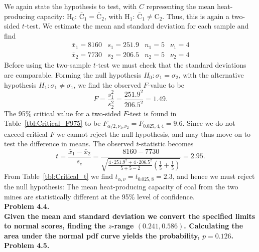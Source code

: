 We again state the hypothesis to test, with $C$ representing the mean heat-producing capacity: H$_0$: $\bar{\mbox{C}}_1 = \bar{\mbox{C}}_2$,
with H$_1$: $\bar{\mbox{C}}_1 \neq {\mbox{C}}_2$.  Thus, this is again a two-sided $t$-test.  We estimate the mean and
standard deviation for each sample and find
\[ \begin{array}{cccc}
\bar{x}_1 = 8160 & s_1 = 251.9 & n_1 = 5 & \nu_1 = 4 \\
\bar{x}_2 = 7730 & s_2 = 206.5 & n_2 = 5 & \nu_2 = 4
\end{array}
\]
Before using the two-sample $t$-test we must check that the standard deviations are
comparable.  Forming the null hypothesis $H_0: \sigma_1 = \sigma_2$, with the alternative
hypothesis $H_1: \sigma_1 \neq \sigma_1$, we find the observed $F$-value to be
\[ F = \frac{s_1^2}{s_2^2} = \frac{251.9^2}{206.5^2} = 1.49. \]
The 95\% critical value for a two-sided $F$-test is found in Table~\ref{tbl:Critical_F975} to be
$F_{\alpha/2,\nu_1,\nu_2} = F_{0.025,4,4} = 9.6$.
Since we do not exceed critical $F$ we cannot reject the null hypothesis, and may thus move on to test
the difference in means. The observed $t$-statistic becomes
\[ t = \frac{\bar{x}_1 - \bar{x}_2}{s_e} =
\frac{8160 - 7730}{\sqrt{\frac{4\cdot251.9^2 + 4\cdot206.5^2}{5 + 5 - 2} \left( \frac{1}{5} + \frac{1}{5} \right)}} = 2.95.
\]
From Table~\ref{tbl:Critical_t} we find $t_{\alpha,\nu} = t_{0.025,8} = 2.3$, and hence we must
reject the null hypothesis: The mean heat-producing capacity of coal from the two mines are
statistically different at the 95\% level of confidence.
\\

\noindent
\bf{Problem 4.4.} \\

Given the mean and standard deviation we convert the specified limits to normal scores, finding the $z$-range $(0.241,0.586)$.
Calculating the area under the normal pdf curve yields the probability, $p = 0.126$.
\\

\noindent
\bf{Problem 4.5.} \\


